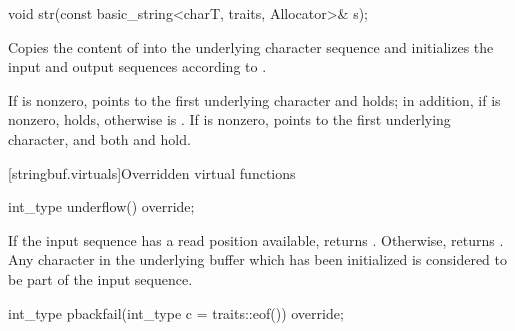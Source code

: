 %
\begin{itemdecl}
void str(const basic_string<charT, traits, Allocator>& s);
\end{itemdecl}

\begin{itemdescr}
\pnum
\effects
Copies the content of  into the  underlying character
sequence and initializes the input and output sequences according to .

\pnum
\ensures If  is nonzero,  points to the
first underlying character and   holds; in
addition, if  is nonzero,
holds, otherwise  is . If  is
nonzero,  points to the first underlying character, and both  and  hold.
\end{itemdescr}

[stringbuf.virtuals]{Overridden virtual functions}

%
\begin{itemdecl}
int_type underflow() override;
\end{itemdecl}

\begin{itemdescr}
\pnum
\returns
If the input sequence has a read position available,
returns
.
Otherwise, returns
.
Any character in the underlying buffer which has been initialized is considered
to be part of the input sequence.
\end{itemdescr}

%
\begin{itemdecl}
int_type pbackfail(int_type c = traits::eof()) override;
\end{itemdecl}


